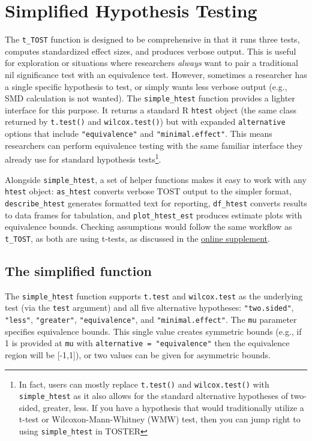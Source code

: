 \documentclass[]{interact}
\theoremstyle{plain}%
\theoremstyle{definition}
\theoremstyle{remark}
\begin{document}
\section{Simplified Hypothesis
Testing}\label{simplified-hypothesis-testing}

The \texttt{t\_TOST} function is designed to be comprehensive in that it
runs three tests, computes standardized effect sizes, and produces
verbose output. This is useful for exploration or situations where
researchers \emph{always} want to pair a traditional nil significance
test with an equivalence test. However, sometimes a researcher has a
single specific hypothesis to test, or simply wants less verbose output
(e.g., SMD calculation is not wanted). The \texttt{simple\_htest}
function provides a lighter interface for this purpose. It returns a
standard R \texttt{htest} object (the same class returned by
\texttt{t.test()} and \texttt{wilcox.test()}) but with expanded
\texttt{alternative} options that include \texttt{"equivalence"} and
\texttt{"minimal.effect"}. This means researchers can perform
equivalence testing with the same familiar interface they already use
for standard hypothesis tests\footnote{In fact, users can mostly replace
  \texttt{t.test()} and \texttt{wilcox.test()} with
  \texttt{simple\_htest} as it also allows for the standard alternative
  hypotheses of two-sided, greater, less. If you have a hypothesis that
  would traditionally utilize a t-test or Wilcoxon-Mann-Whitney (WMW)
  test, then you can jump right to using \texttt{simple\_htest} in
  TOSTER}.

Alongside \texttt{simple\_htest}, a set of helper functions makes it
easy to work with any \texttt{htest} object: \texttt{as\_htest} converts
verbose TOST output to the simpler format, \texttt{describe\_htest}
generates formatted text for reporting, \texttt{df\_htest} converts
results to data frames for tabulation, and \texttt{plot\_htest\_est}
produces estimate plots with equivalence bounds. Checking assumptions
would follow the same workflow as \texttt{t\_TOST}, as both are using
t-tests, as discussed in the
\href{https://doi.org/10.5281/zenodo.22776188}{online supplement}.

\subsection{The simplified function}\label{the-simplified-function}

The \texttt{simple\_htest} function supports \texttt{t.test} and
\texttt{wilcox.test} as the underlying test (via the \texttt{test}
argument) and all five alternative hypotheses: \texttt{"two.sided"},
\texttt{"less"}, \texttt{"greater"}, \texttt{"equivalence"}, and
\texttt{"minimal.effect"}. The \texttt{mu} parameter specifies
equivalence bounds. This single value creates symmetric bounds (e.g., if
1 is provided at \texttt{mu} with \texttt{alternative\ =\ "equivalence"}
then the equivalence region will be {[}-1,1{]}), or two values can be
given for asymmetric bounds.
\end{document}
